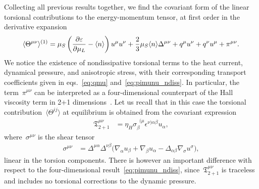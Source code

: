 \documentclass[11pt,a4paper]{article}
\begin{document}
Collecting all previous results together, we find the covariant form of the
linear torsional contributions to the energy-momentum tensor, at first order in the derivative expansion
\begin{align}
\langle \Theta^{\mu\nu}\rangle^{(1)}
=\mu_{S}\left({\partial\varepsilon\over\partial \mu_{L}}-\langle n\rangle\right)u^{\mu}u^{\nu}
+{2\over 3}\mu_{S}\langle n\rangle\Delta^{\mu\nu}
+q^{\mu}u^{\nu}+q^{\nu}u^{\mu}+\pi^{\mu\nu}.
\label{eq:emtensor_full_general}
\end{align}
We notice the existence of nondissipative torsional terms to the heat current, 
dynamical pressure, and anisotropic stress, with their 
corresponding transport coefficients given  
in eqs.~\eqref{eq:qmu} and~\eqref{eq:pimunu_ndiss}. In particular, the term~$\pi^{\mu\nu}$ can be 
interpreted as a four-dimensional counterpart of the
Hall viscosity term in 2+1 dimensions~\cite{Hoyos:2014pba}. Let us recall that in this case
the torsional contribution~$\langle\Theta^{ij}\rangle$
at equilibrium is obtained from the covariant expression~\cite{Valle:2015hfa}
\begin{align}
\mathfrak{T}^{\mu\nu}_{2+1}&=\eta_{H}\sigma_{\beta}^{\,\,\,(\mu}\epsilon^{\nu)\alpha\beta}u_{\alpha},
\label{eq:hall_visco_2+1}
\end{align}
where~$\sigma^{\mu\nu}$ is the shear tensor
\begin{align}
\sigma^{\mu\nu}&=\Delta^{\mu\alpha}\Delta^{\nu\beta}\big(\nabla_{\alpha}u_{\beta}+\nabla_{\beta}u_{\alpha}-\Delta_{\alpha\beta}\nabla_{\sigma}u^{\sigma}\big),
\end{align}
linear in the torsion components. There is however an important difference with respect to the 
four-dimensional result~\eqref{eq:pimunu_ndiss}, since~$\mathfrak{T}^{\mu\nu}_{2+1}$
is traceless and includes no torsional corrections
to the dynamic pressure. 
\end{document}
